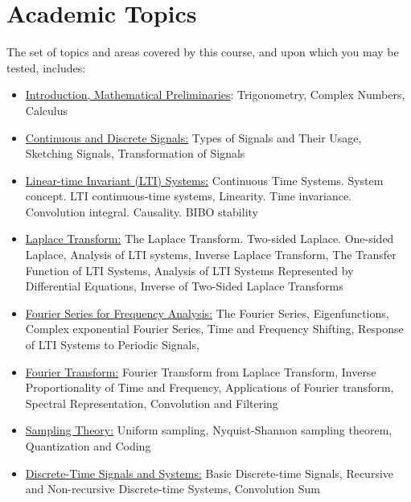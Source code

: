 \documentclass[12pt,nohyper,nobib,xcolor=dvipsnames,svgnames,x11names]{tufte-book}
\begin{document}
\section*{Academic Topics} %
\label{sub:academic_topics}

The set of topics and areas covered by this course, and upon which you may be tested, includes:
{
\begin{itemize}
	\item \color{forestgreen} \underline{Introduction, Mathematical Preliminaries}: Trigonometry, Complex Numbers, Calculus
 
    \item \color{darkrose} \underline{Continuous and Discrete Signals:} Types of Signals and Their Usage, Sketching Signals, Transformation of Signals
    
    \item  \color{forestgreen} \underline{Linear-time Invariant (LTI) Systems:} Continuous Time Systems. System concept. LTI continuous-time systems, Linearity. Time invariance. Convolution integral. Causality. BIBO stability
    
    \item   \color{darkrose} \underline{Laplace Transform:} The Laplace Transform. Two-sided Laplace. One-sided Laplace, Analysis of LTI systems, Inverse Laplace Transform, The Transfer Function of LTI Systems, Analysis of LTI Systems Represented by Differential Equations, Inverse of Two-Sided Laplace Transforms
    
    \item  \color{forestgreen} \underline{Fourier Series for Frequency Analysis:} The Fourier Series, Eigenfunctions, Complex exponential Fourier Series, Time and Frequency Shifting, Response of LTI Systems to Periodic Signals, 


    \item  \color{darkrose} \underline{Fourier Transform:} Fourier Transform from Laplace Transform, Inverse Proportionality of Time and Frequency, Applications of Fourier transform, Spectral Representation, Convolution and Filtering
    
    \item \color{forestgreen} \underline{Sampling Theory:} Uniform sampling, Nyquist-Shannon sampling theorem, Quantization and Coding
    
    \item   \color{darkrose}  \underline{Discrete-Time Signals and Systems:} Basic Discrete-time Signals, Recursive and Non-recursive Discrete-time Systems, Convolution Sum
    

\end{itemize}}
\end{document}

